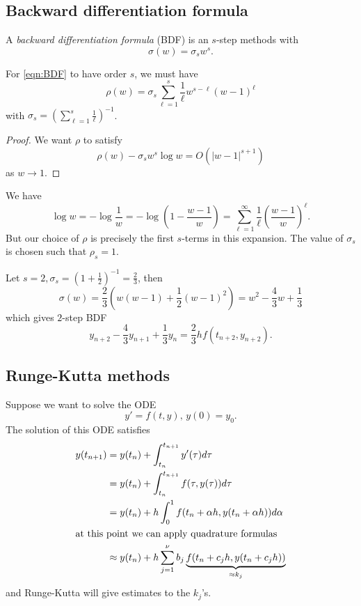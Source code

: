 \documentclass[a4paper]{article}
\begin{document}
\subsection{Backward differentiation formula}

\begin{definition}
  A \emph{backward differentiation formula} (BDF) is an \(s\)-step methods with
  \begin{equation}
    \label{eqn:BDF}
    \sigma(w) = \sigma_sw^s.
  \end{equation}
\end{definition}

\begin{theorem}
  For \eqref{eqn:BDF} to have order \(s\), we must have
  \[
    \rho(w) = \sigma_s \sum_{\ell = 1}^s \frac{1}{\ell} w^{s - \ell}(w - 1)^\ell
  \]
  with \(\sigma_s = \left( \sum_{\ell = 1}^s \frac{1}{\ell} \right)^{-1}\).
\end{theorem}

\begin{proof}
  We want \(\rho\) to satisfy
  \[
    \rho(w) - \sigma_sw^s\log w = O(|w - 1|^{s + 1})
  \]
  as \(w \to 1\).
\end{proof}
We have
\[
  \log w
  = -\log \frac{1}{w}
  = -\log \left( 1 - \frac{w - 1}{w} \right)
  = \sum_{\ell = 1}^\infty \frac{1}{\ell} \left( \frac{w - 1}{w} \right)^\ell.
\]
But our choice of \(\rho\) is precisely the first \(s\)-terms in this expansion. The value of \(\sigma_s\) is chosen such that \(\rho_s = 1\).

\begin{eg}
  Let \(s = 2, \sigma_s = (1 + \frac{1}{2})^{-1} = \frac{2}{3}\), then
  \[
    \sigma(w) = \frac{2}{3}(w(w - 1) + \frac{1}{2}(w - 1)^2) = w^2 - \frac{4}{3}w + \frac{1}{3}
  \]
  which gives \(2\)-step BDF
  \[
    y_{n + 2} - \frac{4}{3}y_{n + 1} + \frac{1}{3}y_n = \frac{2}{3}h f(t_{n + 2}, y_{n + 2}).
  \]
\end{eg}

\subsection{Runge-Kutta methods}

Suppose we want to solve the ODE
\[
  y' = f(t, y),\, y(0) = y_0.
\]
The solution of this ODE satisfies
\begin{align*}
  y(t_{n + 1})
  &= y(t_n) + \int_{t_n}^{t_{n + 1}} y'(\tau) d\tau \\
  &= y(t_n) + \int_{t_n}^{t_{n + 1}} f(\tau, y(\tau)) d\tau \\
  &= y(t_n) + h \int_0^1 f(t_n + \alpha h, y(t_n + \alpha h)) d\alpha \\
\intertext{at this point we can apply quadrature formulas}
  &\approx y(t_n) + h \sum_{j = 1}^\nu b_j \underbrace{f(t_n + c_j h, y(t_n + c_j h))}_{\approx k_j}
\end{align*}
and Runge-Kutta will give estimates to the \(k_j\)'s.
\end{document}
